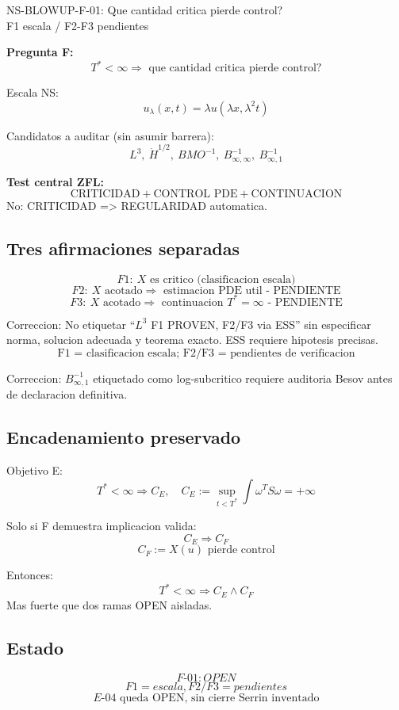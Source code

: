 \documentclass[11pt]{article}
\begin{document}
\begin{center}
{\Large NS-BLOWUP-F-01: Que cantidad critica pierde control?}\\
F1 escala / F2-F3 pendientes
\end{center}

\textbf{Pregunta F:}
\[
\boxed{T^*<\infty\Rightarrow\text{ que cantidad critica pierde control?}}
\]

Escala NS:
\[
u_\lambda(x,t)=\lambda u(\lambda x,\lambda^2 t)
\]

Candidatos a auditar (sin asumir barrera):
\[
L^3,\ \dot H^{1/2},\ BMO^{-1},\ B^{-1}_{\infty,\infty},\ B^{-1}_{\infty,1}
\]

\textbf{Test central ZFL:}
\[
\boxed{\text{CRITICIDAD}+\text{CONTROL PDE}+\text{CONTINUACION}}
\]
No: CRITICIDAD => REGULARIDAD automatica.

\subsection*{Tres afirmaciones separadas}
\[
\boxed{F1:\ X\text{ es critico (clasificacion escala)}}
\]
\[
\boxed{F2:\ X\text{ acotado}\Rightarrow\text{ estimacion PDE util - PENDIENTE}}
\]
\[
\boxed{F3:\ X\text{ acotado}\Rightarrow\text{ continuacion }T^*=\infty\text{ - PENDIENTE}}
\]

Correccion: No etiquetar ``$L^3$ F1 PROVEN, F2/F3 via ESS'' sin especificar norma, solucion adecuada y teorema exacto. ESS requiere hipotesis precisas.
\[
\boxed{\text{F1 = clasificacion escala; F2/F3 = pendientes de verificacion}}
\]

Correccion: $B^{-1}_{\infty,1}$ etiquetado como log-subcritico requiere auditoria Besov antes de declaracion definitiva.

\subsection*{Encadenamiento preservado}
Objetivo E:
\[
\boxed{T^*<\infty\Rightarrow C_E,\quad C_E:=\sup_{t<T^*}\int\omega^T S\omega=+\infty}
\]

Solo si F demuestra implicacion valida:
\[
\boxed{C_E\Rightarrow C_F}
\]
\[
\boxed{C_F:=X(u)\text{ pierde control}}
\]

Entonces:
\[
\boxed{T^*<\infty\Rightarrow C_E\land C_F}
\]
Mas fuerte que dos ramas OPEN aisladas.

\subsection*{Estado}
\[
\boxed{F\text{-}01: OPEN}
\]
\[
\boxed{F1 = escala, F2/F3 = pendientes}
\]
\[
\boxed{E\text{-}04\text{ queda OPEN, sin cierre Serrin inventado}}
\]
\end{document}
